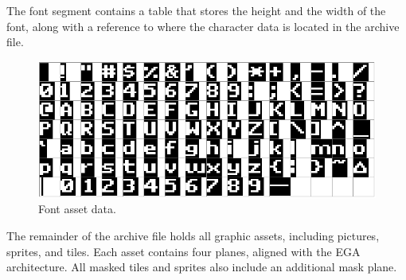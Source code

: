 \documentclass[book.tex]{subfiles}
\begin{document}
\par
The font segment contains a table that stores the height and the width of the font, along with a reference to where the character data is located in the archive file.\\


\par
\begin{minipage}{\textwidth}
 \par
 \end{minipage}


\par
\begin{figure}[H] 
  \centering 
  \includegraphics[width=1.0\textwidth]{imgs/drawings/font.eps}
  \caption{Font asset data.}
  \label{fig:font_assets}
\end{figure} 

\par
The remainder of the archive file holds all graphic assets, including pictures, sprites, and tiles. Each asset contains four planes, aligned with the EGA architecture. All masked tiles and sprites also include an additional mask plane.\\
\end{document}
